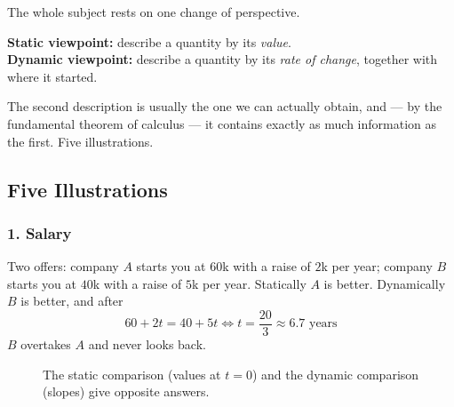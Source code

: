 
The whole subject rests on one change of perspective.

\begin{moral}
	\textbf{Static viewpoint:} describe a quantity by its \emph{value}.\\
	\textbf{Dynamic viewpoint:} describe a quantity by its \emph{rate of change}, together
	with where it started.
\end{moral}

The second description is usually the one we can actually obtain, and --- by the
fundamental theorem of calculus --- it contains exactly as much information as the first.
Five illustrations.

\subsection{Five Illustrations}

\subsubsection*{1. Salary}

Two offers: company \(A\) starts you at \(60\)k with a raise of \(2\)k per year;
company \(B\) starts you at \(40\)k with a raise of \(5\)k per year. Statically \(A\) is
better. Dynamically \(B\) is better, and after
\[
	60 + 2t = 40 + 5t \iff t = \frac{20}{3} \approx 6.7 \text{ years}
\]
\(B\) overtakes \(A\) and never looks back.

\begin{figure}[H]
	\centering
	\caption{The static comparison (values at \(t=0\)) and the dynamic comparison
		(slopes) give opposite answers.}
\end{figure}

